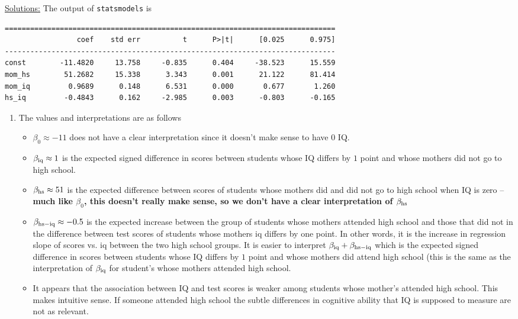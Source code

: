 \begin{itemize}
\begin{example}
\noindent
\underline{Solutions:} 
The output of \verb!statsmodels! is 
\begin{Verbatim}
==============================================================================
                 coef    std err          t      P>|t|      [0.025      0.975]
------------------------------------------------------------------------------
const        -11.4820     13.758     -0.835      0.404     -38.523      15.559
mom_hs        51.2682     15.338      3.343      0.001      21.122      81.414
mom_iq         0.9689      0.148      6.531      0.000       0.677       1.260
hs_iq         -0.4843      0.162     -2.985      0.003      -0.803      -0.165
\end{Verbatim}
\vspace{.4cm}

\begin{enumerate}[label=(\alph*)]
\item The values and interpretations are as follows
\begin{itemize}
\item $\beta_0 \approx -11$ does not have a clear interpretation since it doesn't make sense to have $0$ IQ. 
\item $\beta_{\rm iq}\approx 1$ is the expected signed difference in scores between students whose IQ differs by $1$ point and whose mothers did not go to high school. 
\item $\beta_{\rm hs} \approx 51$ is the expected difference between scores of students whose mothers did and did not go to high school when IQ is zero -- {\bf much like $\beta_0$, this doesn't really make sense, so we don't have a clear interpretation of $\beta_{\rm hs}$}
\item $\beta_{\rm hs-iq}\approx -0.5$ is the expected increase between the group of students whose mothers attended high school and those that did not in the difference between test scores of students whose mothers iq differs by one point. In other words, it is the increase in regression slope of scores vs. iq between the two high school groups. It is easier to interpret $\beta_{\rm iq}  + \beta_{\rm hs-iq}$ which is the expected signed difference in scores between students whose IQ differs by $1$ point and whose mothers did attend high school (this is the same as the interpretation of $\beta_{\rm iq}$ for student's whose mothers attended high school. 
\item It appears that the association between IQ and test scores is weaker among students whose mother's attended high school. This makes intuitive sense. If someone attended high school the subtle differences in cognitive ability that IQ is supposed to measure are not as relevant. 
\end{itemize}
\end{enumerate}




\end{example}
\end{itemize}
